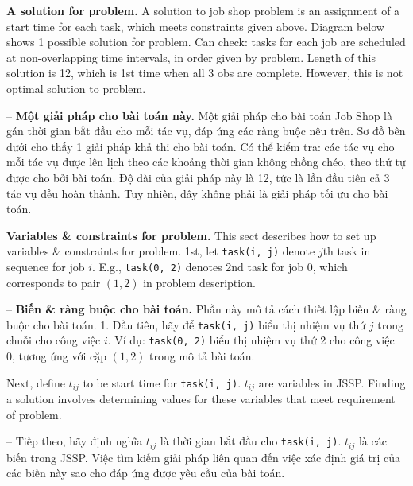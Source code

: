 \documentclass{article}
\begin{document}
{\bf A solution for problem.} A solution to job shop problem is an assignment of a start time for each task, which meets constraints given above. Diagram below shows 1 possible solution for problem. Can check: tasks for each job are scheduled at non-overlapping time intervals, in order given by problem. Length of this solution is 12, which is 1st time when all 3 obs are complete. However, this is not optimal solution to problem.

-- {\bf Một giải pháp cho bài toán này.} Một giải pháp cho bài toán Job Shop là gán thời gian bắt đầu cho mỗi tác vụ, đáp ứng các ràng buộc nêu trên. Sơ đồ bên dưới cho thấy 1 giải pháp khả thi cho bài toán. Có thể kiểm tra: các tác vụ cho mỗi tác vụ được lên lịch theo các khoảng thời gian không chồng chéo, theo thứ tự được cho bởi bài toán. Độ dài của giải pháp này là 12, tức là lần đầu tiên cả 3 tác vụ đều hoàn thành. Tuy nhiên, đây không phải là giải pháp tối ưu cho bài toán.

{\bf Variables \& constraints for problem.} This sect describes how to set up variables \& constraints for problem. 1st, let {\tt task(i, j)} denote $j$th task in sequence for job $i$. E.g., {\tt task(0, 2)} denotes 2nd task for job 0, which corresponds to pair $(1,2)$ in problem description.

-- {\bf Biến \& ràng buộc cho bài toán.} Phần này mô tả cách thiết lập biến \& ràng buộc cho bài toán. 1. Đầu tiên, hãy để {\tt task(i, j)} biểu thị nhiệm vụ thứ $j$ trong chuỗi cho công việc $i$. Ví dụ: {\tt task(0, 2)} biểu thị nhiệm vụ thứ 2 cho công việc 0, tương ứng với cặp $(1,2)$ trong mô tả bài toán.

Next, define $t_{ij}$ to be start time for {\tt task(i, j)}. $t_{ij}$ are variables in JSSP. Finding a solution involves determining values for these variables that meet requirement of problem.

-- Tiếp theo, hãy định nghĩa $t_{ij}$ là thời gian bắt đầu cho {\tt task(i, j)}. $t_{ij}$ là các biến trong JSSP. Việc tìm kiếm giải pháp liên quan đến việc xác định giá trị của các biến này sao cho đáp ứng được yêu cầu của bài toán.
\end{document}

